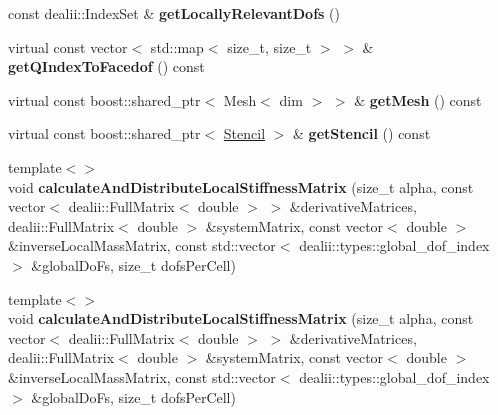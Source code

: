 \begin{DoxyCompactItemize}
\item 
\hypertarget{classnatrium_1_1SEDGMinLee_a9c47f73e0a2dcd738573b57f61da75fc}{
const dealii::IndexSet \& {\bfseries getLocallyRelevantDofs} ()}
\label{classnatrium_1_1SEDGMinLee_a9c47f73e0a2dcd738573b57f61da75fc}

\item 
\hypertarget{classnatrium_1_1SEDGMinLee_a6bb31f5b359305f3f36ec5000767c8a3}{
virtual const vector$<$ std::map$<$ size\_\-t, size\_\-t $>$ $>$ \& {\bfseries getQIndexToFacedof} () const }
\label{classnatrium_1_1SEDGMinLee_a6bb31f5b359305f3f36ec5000767c8a3}

\item 
\hypertarget{classnatrium_1_1SEDGMinLee_a23bb9307417d9626121422252dad46d9}{
virtual const boost::shared\_\-ptr$<$ Mesh$<$ dim $>$ $>$ \& {\bfseries getMesh} () const }
\label{classnatrium_1_1SEDGMinLee_a23bb9307417d9626121422252dad46d9}

\item 
\hypertarget{classnatrium_1_1SEDGMinLee_a102114aac5fa9d33a4bf7a1f70eb3ed8}{
virtual const boost::shared\_\-ptr$<$ \hyperlink{classnatrium_1_1Stencil}{Stencil} $>$ \& {\bfseries getStencil} () const }
\label{classnatrium_1_1SEDGMinLee_a102114aac5fa9d33a4bf7a1f70eb3ed8}

\item 
\hypertarget{classnatrium_1_1SEDGMinLee_ab9bdc47144e9e45960ca1bee2593d713}{
{\footnotesize template$<$$>$ }\\void {\bfseries calculateAndDistributeLocalStiffnessMatrix} (size\_\-t alpha, const vector$<$ dealii::FullMatrix$<$ double $>$ $>$ \&derivativeMatrices, dealii::FullMatrix$<$ double $>$ \&systemMatrix, const vector$<$ double $>$ \&inverseLocalMassMatrix, const std::vector$<$ dealii::types::global\_\-dof\_\-index $>$ \&globalDoFs, size\_\-t dofsPerCell)}
\label{classnatrium_1_1SEDGMinLee_ab9bdc47144e9e45960ca1bee2593d713}

\item 
\hypertarget{classnatrium_1_1SEDGMinLee_a7d20a56bbe96969ef037be2a6f47d12d}{
{\footnotesize template$<$$>$ }\\void {\bfseries calculateAndDistributeLocalStiffnessMatrix} (size\_\-t alpha, const vector$<$ dealii::FullMatrix$<$ double $>$ $>$ \&derivativeMatrices, dealii::FullMatrix$<$ double $>$ \&systemMatrix, const vector$<$ double $>$ \&inverseLocalMassMatrix, const std::vector$<$ dealii::types::global\_\-dof\_\-index $>$ \&globalDoFs, size\_\-t dofsPerCell)}
\label{classnatrium_1_1SEDGMinLee_a7d20a56bbe96969ef037be2a6f47d12d}

\end{DoxyCompactItemize}


